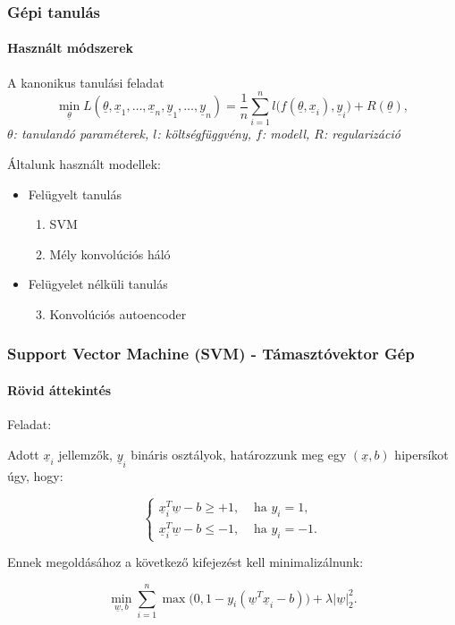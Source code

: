 \documentclass[11pt]{beamer}
\newcommand{\sumn}[1]{\sum\limits_{{#1}=1}^{n}}
\begin{document}
\begin{frame}
	\frametitle{Gépi tanulás}
	\framesubtitle{Használt módszerek}
	
	
	\begin{block}{A kanonikus tanulási feladat}
			\[ 
		\min\limits_{\underline{\theta}} L(\underline{\theta}, \underline{x}_1, \dots, \underline{x}_n, \underline{y}_1, \dots, \underline{y}_n) = \frac{1}{n}  \sumn i l\big(f(\underline{\theta}, \underline{x}_i), \underline{y}_i\big) + R(\underline{\theta})
		, \]
	\textit{$ \theta $: tanulandó paraméterek, $ l $: költségfüggvény, $ f $: modell, $ R $: regularizáció}
	\end{block}


	
	Általunk használt modellek:
	\begin{itemize}
	\item 
		Felügyelt tanulás
		
		\begin{enumerate}
		\item 
			SVM	
		\item 
			Mély konvolúciós háló
		
		\end{enumerate}
		
	\item 
		Felügyelet nélküli tanulás
		
		\begin{enumerate}
		\setcounter{enumi}{2}
		\item 
			Konvolúciós autoencoder
		\end{enumerate}		
		
	\end{itemize}
\end{frame}




\begin{frame}
	\frametitle{Support Vector Machine (SVM) - Támasztóvektor Gép}
	\framesubtitle{Rövid áttekintés}
		
	Feladat: 
	
	Adott $ \underline{x}_i $ jellemzők, $ \underline{y}_i $ bináris osztályok, 
	határozzunk meg egy $ (\underline{x}, b) $ hipersíkot úgy, hogy: 
	
	\[
	\begin{cases}
	\underline{x}_i^T \underline{w} - b \geq +1, & \text{ ha }  y_i=1, \\
	\underline{x}_i^T \underline{w} - b \leq -1, & \text{ ha }  y_i=-1.
	\end{cases}
	\]	
	
	Ennek megoldásához a következő kifejezést kell minimalizálnunk:
	
	\[
	\min_{\underline{w},b}
	\sum\limits_{i=1}^{n} 
	\max\big(0, 1 - y_i(\underline{w}^T \underline{x}_i - b)\big) + \lambda \lvert\underline{w}\rvert_2^2.
	\]
	
	
	
\end{frame}
\end{document}
